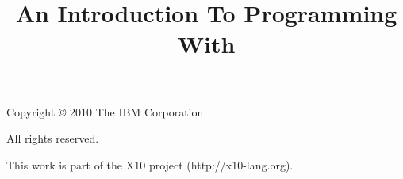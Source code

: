 
\thispagestyle{empty}

\title{An Introduction To Programming With \Xten}
\author{
}
\maketitle

\newpage
\vspace*{5in}
Copyright \copyright{} 2010 The IBM Corporation

All rights reserved.

This work is part of the X10 project (http://x10-lang.org).
